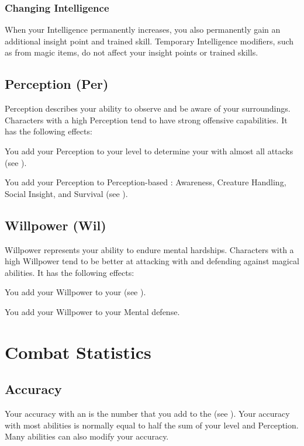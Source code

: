     \subsubsection{Changing Intelligence}\label{Changing Intelligence}
      When your Intelligence permanently increases, you also permanently gain an additional insight point and trained skill.
      Temporary Intelligence modifiers, such as from magic items, do not affect your insight points or trained skills.

  \subsection{Perception (Per)}\label{Perception}
    {
      Perception describes your ability to observe and be aware of your surroundings.
      Characters with a high Perception tend to have strong offensive capabilities.
      It has the following effects:
      \begin{raggeditemize}
        \item You add your Perception to your level to determine your  with almost all attacks (see ).
        \item You add your Perception to Perception-based : Awareness, Creature Handling, Social Insight, and Survival (see ).
      \end{raggeditemize}
    }

  \subsection{Willpower (Wil)}\label{Willpower}
    {
      Willpower represents your ability to endure mental hardships.
      Characters with a high Willpower tend to be better at attacking with and defending against magical abilities.
      It has the following effects:
      \begin{raggeditemize}
        \item You add your Willpower to your  (see ).
        \item You add your Willpower to your Mental defense.
      \end{raggeditemize}
    }

\section{Combat Statistics}\label{Combat Statistics}

  \subsection{Accuracy}\label{Accuracy}
    Your accuracy with an  is the number that you add to the  (see ).
    Your accuracy with most abilities is normally equal to half the sum of your level and Perception.
    Many abilities can also modify your accuracy.

